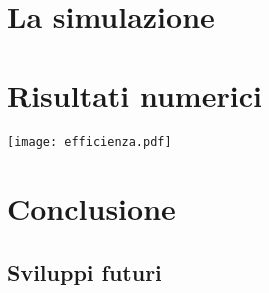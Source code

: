 \documentclass[a4paper]{memoir}
\begin{document}
\cleardoublepage{}
\chapter{La simulazione}
\cite{Razavi11}

\cleardoublepage{}
\chapter{Risultati numerici}
\texttt{[image: efficienza.pdf]}

\cleardoublepage{}
\chapter{Conclusione}

\section{Sviluppi futuri}



\end{document}
